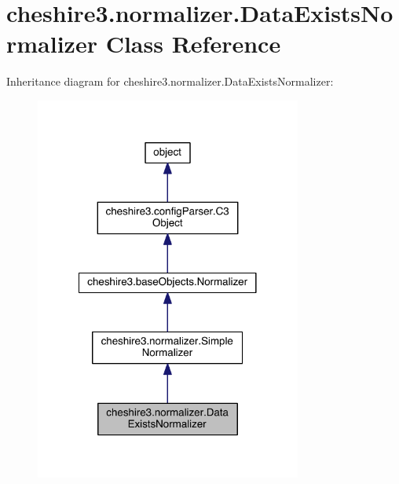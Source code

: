 \hypertarget{classcheshire3_1_1normalizer_1_1_data_exists_normalizer}{\section{cheshire3.\-normalizer.\-Data\-Exists\-Normalizer Class Reference}
\label{classcheshire3_1_1normalizer_1_1_data_exists_normalizer}
}


Inheritance diagram for cheshire3.\-normalizer.\-Data\-Exists\-Normalizer\-:
\nopagebreak
\begin{figure}[H]
\begin{center}
\leavevmode
\includegraphics[width=248pt]{classcheshire3_1_1normalizer_1_1_data_exists_normalizer__inherit__graph}
\end{center}
\end{figure}



